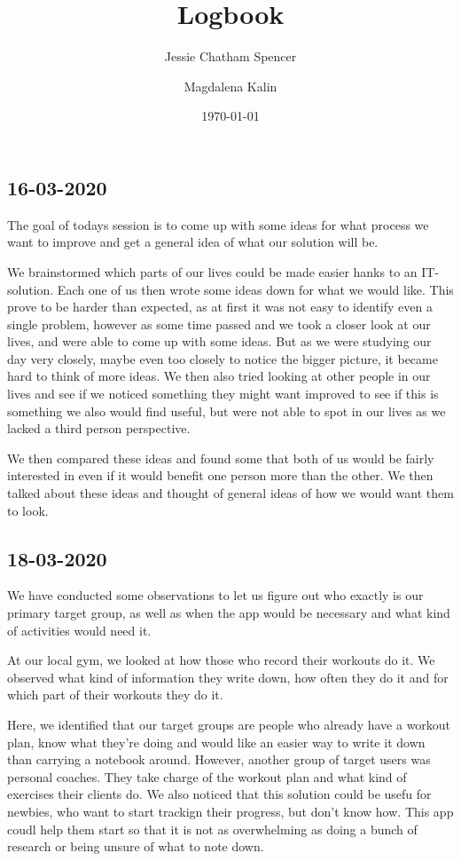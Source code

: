 \documentclass{article}
\title{Logbook}
\author{Jessie Chatham Spencer \and Magdalena Kalin}
\date{\today}
\begin{document}
\maketitle
\subsection*{16-03-2020}
The goal of todays session is to come up with some ideas for what process we want to improve and get a general idea of what our solution will be. 

We brainstormed which parts of our lives could be made easier hanks to an IT-solution. Each one of us then wrote some ideas down for what we would like. This prove to be harder than expected, as at first it was not easy to identify even a single problem, however as some time passed and we took a closer look at our lives, and were able to come up with some ideas. But as we were studying our day very closely, maybe even too closely to notice the bigger picture, it became hard to think of more ideas. We then also tried looking at other people in our lives and see if we noticed something they might want improved to see if this is something we also would find useful, but were not able to spot in our lives as we lacked a third person perspective.

We then compared these ideas and found some that both of us would be fairly interested in even if it would benefit one person more than the other. We then talked about these ideas and thought of general ideas of how we would want them to look.

\subsection*{18-03-2020}
We have conducted some observations to let us figure out who exactly is our primary target group, as well as when the app would be necessary and what kind of activities would need it.

At our local gym, we looked at how those who record their workouts do it. We observed what kind of information they write down, how often they do it and for which part of their workouts they do it.

Here, we identified that our target groups are people who already have a workout plan, know what they're doing and would like an easier way to write it down than carrying a notebook around. However, another group of target users was personal coaches. They take charge of the workout plan and what kind of exercises their clients do. We also noticed that this solution could be usefu for newbies, who want to start trackign their progress, but don't know how. This app coudl help them start so that it is not as overwhelming as doing a bunch of research or being unsure of what to note down.
\end{document}
